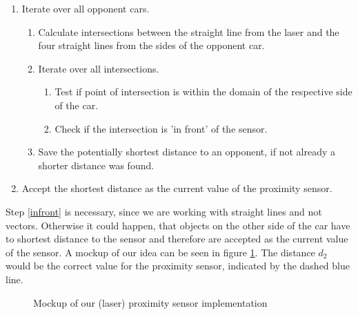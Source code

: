 \documentclass[paper=a4, fontsize=11pt]{scrreprt}
\begin{document}
\begin{enumerate}
  \item Iterate over all opponent cars.
  \begin{enumerate}
    \item Calculate intersections between the straight line from the laser
    and the four straight lines from the sides of the opponent car.
    \item Iterate over all intersections.
    \begin{enumerate}
      \item Test if point of intersection is within the domain of the respective side of the car.
      \item\label{infront} Check if the intersection is 'in front' of the sensor.
    \end{enumerate}
    \item Save the potentially shortest distance to an opponent, if not already a shorter distance was found.
  \end{enumerate}
  \item Accept the shortest distance as the current value of the proximity sensor.
\end{enumerate}

Step \ref{infront} is necessary, since we are working with straight lines
and not vectors. Otherwise it could happen,
that objects on the other side of the car have to shortest distance to the sensor
and therefore are accepted as the current value of the sensor.
A mockup of our idea can be seen in figure \ref{aw_mockup}.
The distance $d_2$ would be the correct value for the proximity sensor,
indicated by the dashed blue line.

\begin{figure}[ht]\label{aw_mockup}
  \begin{center}
    \caption{Mockup of our (laser) proximity sensor implementation}
  \end{center}
\end{figure}
\end{document}
